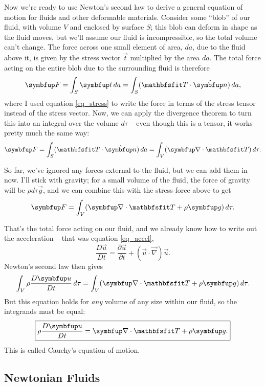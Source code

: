 Now we're ready to use Newton's second law to derive a general equation of motion for fluids and other deformable materials.  Consider some ``blob'' of our fluid, with volume $V$ and enclosed by surface $S$; this blob can deform in shape as the fluid moves, but we'll assume our fluid is incompressible, so the total volume can't change.  The force across one small element of area, $da$, due to the fluid above it, is given by the stress vector $\vec{t}$ multiplied by the area $da$.  The total force acting on the entire blob due to the surrounding fluid is therefore
\begin{equation}
\label{eq_stress_tensor_force}
\vec{F} = \int_S \vec{t} \, da = \int_S (\tens{T} \cdot \unit{n}) \, da,
\end{equation}
where I used equation \ref{eq_stress} to write the force in terms of the stress tensor instead of the stress vector.  Now, we can apply the divergence theorem to turn this into an integral over the volume $d\tau$ -- even though this is a tensor, it works pretty much the same way:
\[
\vec{F} =  \int_S (\tens{T} \cdot \unit{n}) \, da = \int_V (\grad \cdot \tens{T} ) \, d\tau.
\]

So far, we've ignored any forces external to the fluid, but we can add them in now.  I'll stick with gravity; for a small volume of the fluid, the force of gravity will be $\rho d\tau \vec{g}$, and we can combine this with the stress force above to get
\[
\vec{F} = \int_V (\grad \cdot \tens{T} + \rho \vec{g} ) \, d\tau.
\]

That's the total force acting on our fluid, and we already know how to write out the acceleration -- that was equation \ref{eq_accel},
\[
\frac{D \vec{u}}{Dt} = \frac{\partial \vec{u}}{\partial t} + (\vec{u} \cdot \vec{\nabla}) \vec{u}.
\]
Newton's second law then gives
\[
\int_V \rho \frac{D \vec{u}}{Dt} \, d\tau = \int_V (\grad \cdot \tens{T} + \rho \vec{g} ) \, d\tau.
\]
But this equation holds for \emph{any} volume of any size within our fluid, so the integrands must be equal:
\begin{equation}
\boxed{
\rho \frac{D \vec{u}}{Dt} =\grad \cdot \tens{T} + \rho \vec{g}.
}
\label{eq_cauchy}
\end{equation}
This is called Cauchy's equation of motion.

\subsection{Newtonian Fluids}

